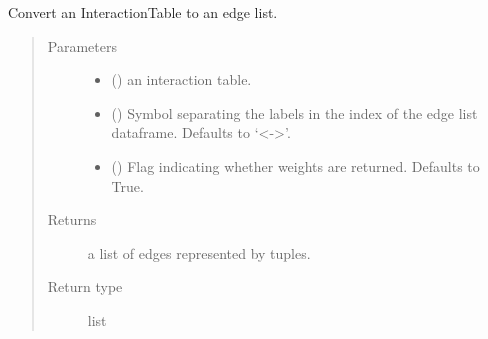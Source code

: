 \documentclass[letterpaper,10pt,english]{sphinxmanual}
\begin{document}

\begin{fulllineitems}
\label{\detokenize{_modules/cosifer.collections:cosifer.collections.interaction_table.interaction_table_to_edge_list}}
Convert an InteractionTable to an edge list.
\begin{quote}\begin{description}
\item[{Parameters}] \leavevmode\begin{itemize}
\item {} 
 ({\hyperref[\detokenize{_modules/cosifer.collections:cosifer.collections.interaction_table.InteractionTable}]{}}) \textendash{} an interaction table.

\item {} 
 (\sphinxstyleliteralemphasis{\sphinxupquote{, }}) \textendash{} Symbol separating the labels
in the index of the edge list dataframe. Defaults to ‘\textless{}-\textgreater{}’.

\item {} 
 (\sphinxstyleliteralemphasis{\sphinxupquote{, }}) \textendash{} Flag indicating whether weights are
returned. Defaults to True.

\end{itemize}

\item[{Returns}] \leavevmode
a list of edges represented by tuples.

\item[{Return type}] \leavevmode
list

\end{description}\end{quote}

\end{fulllineitems}
\end{document}
